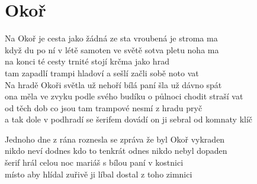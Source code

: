 \section{Okoř}
\onehalfspacing

Na Okoř je cesta jako žádná ze sta  vroubená je stroma  ma \\
 když du po ní v létě samoten ve světě   sotva pletu noha  ma \\
 na konci té cesty  trnité   stojí krčma jako   hrad \\
 tam zapadlí trampi hladoví a sešlí   začli sobě noto  vat \\

 Na hradě Okoři   světla už nehoří  bílá paní   šla už dávno  spát \\
 ona měla ve zvyku   podle svého budíku  o půlnoci   chodit straší  vat \\
  od těch dob co jsou tam  trampové   nesmí z hradu   pryč \\
 a tak dole v podhradí   se šerifem dovádí  on ji sebral   od komnaty  klíč \\

\singlespacing

\sloka{}
Jednoho dne z rána roznesla se zpráva že byl Okoř vykraden \\
nikdo neví dodnes kdo to tenkrát odnes nikdo nebyl dopaden \\
šerif hrál celou noc mariáš s bílou paní v kostnici \\
místo aby hlídal zuřivě ji líbal dostal z toho zimnici \\

